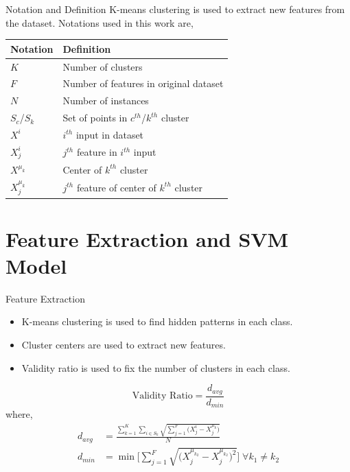 \documentclass[xcolor=dvipsnames]{beamer}
\begin{document}
\begin{frame}{Notation and Definition}
K-means clustering is used to extract new features from the dataset. Notations used in this work are,
 
\begin{table}[H]
\centering
\begin{tabular}{|l|l|}
\hline
Notation      & Definition                                   \\ \hline
$K$           & Number of clusters                           \\
$F$           & Number of features in original dataset       \\
$N$			  & Number of instances							 \\	
$S_c$/$S_k$   & Set of points in $c^{th}$/$k^{th}$ cluster   \\
$X^i$         & $i^{th}$ input in dataset                    \\
$X^i_j$       & $j^{th}$ feature in $i^{th}$ input           \\
$X^{\mu_k}$   & Center of $k^{th}$ cluster                     \\
$X^{\mu_k}_j$ & $j^{th}$ feature of center of $k^{th}$ cluster \\ \hline
\end{tabular}
\end{table}
\end{frame}

\section{Feature Extraction and SVM Model}
\begin{frame}{Feature Extraction}
\begin{itemize}
\item K-means clustering is used to find hidden patterns in each class.
\item Cluster centers are used to extract new features.
\item Validity ratio is used to fix the number of clusters in each class. 
\end{itemize}
\begin{equation*}
\text{Validity Ratio} = \frac{d_{avg}}{d_{min}}
\end{equation*}
\hspace{1cm}where,
\begin{align*}
d_{avg} &= \displaystyle \frac{\sum_{k=1}^K \sum_{i \in S_k} \sqrt{\sum_{j=1}^F \big(X_j^i - X_j^{\mu_k}\big)}}{N}\\
d_{min} &= \min \bigg[\sum_{j=1}^F\sqrt{\big(X_j^{\mu_{k_2}} - X_j^{\mu_{k_2}}\big)^2}\bigg] \; \forall k_1 \neq k_2
\end{align*} 
\end{frame}
\end{document}
